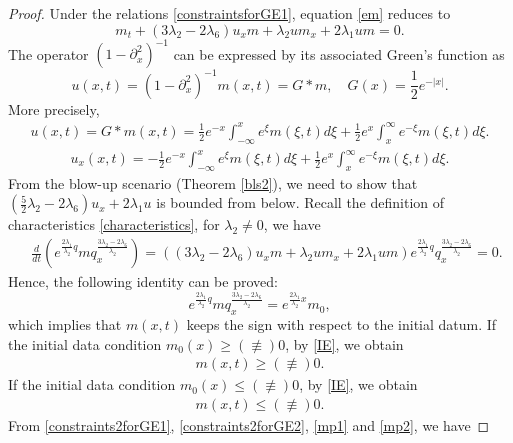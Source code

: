 \documentclass[11pt]{article}
\begin{document}
\begin{proof}
Under the relations \eqref{constraintsforGE1}, equation \eqref{em} reduces to 
\begin{equation*}\label{em1}
m_t+(3\lambda_2-2\lambda_6)u_xm+\lambda_2um_x+2\lambda_1um=0.
\end{equation*} 
The operator $(1-\partial_x^2)^{-1} $ can be expressed by its associated Green's function as
$$u(x,t)=(1-\partial_x^2)^{-1} m(x,t)=G*m,\quad G(x)=\frac{1}{2}e^{-|x|}.$$
More precisely,
\begin{eqnarray*}\label{u}
u(x,t)=G\ast m(x,t)=\frac{1}{2}e^{-x}\int_{-\infty}^{x}e^{\xi}m(\xi,t)d\xi+\frac{1}{2}e^{x}\int_x^{\infty}e^{-\xi}m(\xi,t)d\xi.
\end{eqnarray*}
\begin{eqnarray*}\label{ux}
u_x(x,t)=-\frac{1}{2}e^{-x}\int_{-\infty}^{x}e^{\xi}m(\xi,t)d\xi+\frac{1}{2}e^{x}\int_x^{\infty}e^{-\xi}m(\xi,t)d\xi.
\end{eqnarray*}
From the blow-up scenario (Theorem \ref{bls2}), we need to show that $\left(\frac{5}{2}\lambda_2-2\lambda_6\right)u_x+2\lambda_1u$ is bounded from below.
Recall the definition of characteristics \eqref{characteristics}, for $\lambda_2\neq0$, we have 
\begin{equation*}
\begin{aligned}
\quad\frac{d}{dt}\left(e^{\tfrac{2\lambda_1}{\lambda_2}q}mq_x^{\tfrac{3\lambda_2-2\lambda_6}{\lambda_2}}\right)=\left((3\lambda_2-2\lambda_6)u_xm+\lambda_2um_x+2\lambda_1um\right)
e^{\tfrac{2\lambda_1}{\lambda_2}q}q_x^{\tfrac{3\lambda_2-2\lambda_6}{\lambda_2}}
=0.
\end{aligned}
\end{equation*}
Hence, the following identity can be proved:
\begin{equation}\label{IE}
e^{\tfrac{2\lambda_1}{\lambda_2}q}mq_x^{\tfrac{3\lambda_2-2\lambda_6}{\lambda_2}}
=e^{\tfrac{2\lambda_1}{\lambda_2}x}m_0,
\end{equation}
which implies that $m(x, t)$ keeps the sign with respect to the initial datum.
If the initial data condition $m_0(x)\geq(\not\equiv) 0$, by \eqref{IE}, we obtain
\begin{eqnarray}\label{mp1}
m(x,t)\geq(\not\equiv) 0.
\end{eqnarray}
If the initial data condition $m_0(x)\leq(\not\equiv) 0$, by \eqref{IE}, we obtain
\begin{eqnarray}\label{mp2}
m(x,t)\leq(\not\equiv) 0.
\end{eqnarray}
From \eqref{constraints2forGE1}, \eqref{constraints2forGE2}, \eqref{mp1} and \eqref{mp2}, we have

\end{proof}
\end{document}
